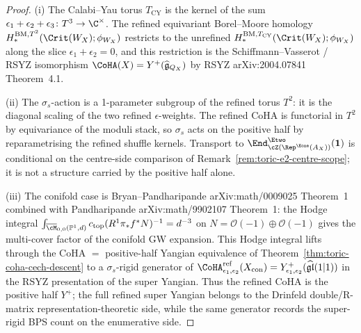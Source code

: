 \begin{proof}
(i) The Calabi--Yau torus $T_{\mathrm{CY}}$ is the kernel of the sum
$\epsilon_1 + \epsilon_2 + \epsilon_3 \colon T^{3} \to \C^{\times}$.
The refined equivariant Borel--Moore homology $H^{\mathrm{BM},
T^{2}}_{*}(\Crit(W_X); \phi_{W_X})$ restricts to the unrefined
$H^{\mathrm{BM}, T_{\mathrm{CY}}}_{*}(\Crit(W_X); \phi_{W_X})$ along
the slice $\epsilon_1 + \epsilon_2 = 0$, and this restriction is the
Schiffmann--Vasserot / RSYZ isomorphism
$\CoHA(X) = Y^{+}(\widehat{\mathfrak{g}}_{Q_X})$ by RSYZ
\textup{arXiv:2004.07841} Theorem~4.1.

(ii) The $\sigma_s$-action is a 1-parameter subgroup of the refined
torus $T^{2}$: it is the diagonal scaling of the two refined
$\epsilon$-weights. The refined CoHA is functorial in $T^{2}$ by
equivariance of the moduli stack, so $\sigma_s$ acts on the positive
half by reparametrising the refined shuffle kernels. Transport to
$\End^{\Etwo}_{\cZ(\Rep^{\Eone}(A_X))}(\mathbf{1})$ is conditional on the
centre-side comparison of Remark~\ref{rem:toric-e2-centre-scope}; it is
not a structure carried by the positive half alone.

(iii) The conifold case is Bryan--Pandharipande
\textup{arXiv:math/0009025} Theorem~1 combined with Pandharipande
\textup{arXiv:math/9902107} Theorem~1: the Hodge integral
$\int_{\overline{\cM}_{0,0}(\mathbb{P}^1, d)}
c_{\mathrm{top}}(R^1 \pi_* f^* N)^{-1} = d^{-3}$
on $N = \mathcal{O}(-1) \oplus \mathcal{O}(-1)$ gives the
multi-cover factor of the conifold GW expansion. This Hodge integral
lifts through the CoHA $=$ positive-half Yangian equivalence of
Theorem~\ref{thm:toric-coha-cech-descent} to a $\sigma_s$-rigid
generator of $\CoHA^{\mathrm{ref}}_{\epsilon_1,
\epsilon_2}(X_{\mathrm{con}}) = Y^{+}_{\epsilon_1,
\epsilon_2}(\widehat{\mathfrak{gl}}(1|1))$ in the RSYZ presentation
of the super Yangian. Thus the refined CoHA is the positive half
$Y^+$; the full refined super Yangian belongs to the Drinfeld
double/R-matrix representation-theoretic side, while the same
generator records the super-rigid BPS count on the enumerative side.
\end{proof}

